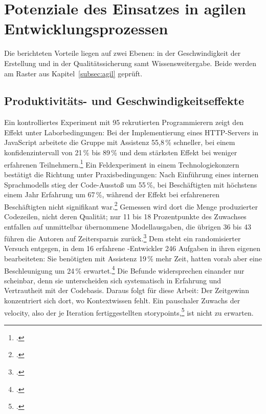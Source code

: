 \section{Potenziale des Einsatzes in agilen Entwicklungsprozessen}\label{sec:potenziale}
Die berichteten Vorteile liegen auf zwei Ebenen: in der Geschwindigkeit der Erstellung und in der Qualitätssicherung samt Wissensweitergabe. Beide werden am Raster aus Kapitel~\ref{subsec:agil} geprüft.

\subsection{Produktivitäts- und Geschwindigkeitseffekte}\label{subsec:produktivitaet}
Ein kontrolliertes Experiment mit 95 rekrutierten Programmierern zeigt den Effekt unter Laborbedingungen: Bei der Implementierung eines \acs{HTTP}-Servers in JavaScript arbeitete die Gruppe mit Assistenz 55,8\,\% schneller, bei einem \gls{konfidenzintervall} von 21\,\% bis 89\,\% und dem stärksten Effekt bei weniger erfahrenen Teilnehmern.\footcite[\vglf][ f.]{Peng.2023} Ein Feldexperiment in einem Technologiekonzern bestätigt die Richtung unter Praxisbedingungen: Nach Einführung eines internen Sprachmodells stieg der Code-Ausstoß um 55\,\%, bei Beschäftigten mit höchstens einem Jahr Erfahrung um 67\,\%, während der Effekt bei erfahreneren Beschäftigten nicht signifikant war.\footcite[\vglf][]{Gambacorta.2024} Gemessen wird dort die Menge produzierter Codezeilen, nicht deren Qualität; nur 11 bis 18 Prozentpunkte des Zuwachses entfallen auf unmittelbar übernommene Modellausgaben, die übrigen 36 bis 43 führen die Autoren auf Zeitersparnis zurück.\footcite[\vglf][]{Gambacorta.2024} Dem steht ein randomisierter Versuch entgegen, in dem 16 erfahrene -Entwickler 246 Aufgaben in ihren eigenen  bearbeiteten: Sie benötigten mit Assistenz 19\,\% mehr Zeit, hatten vorab aber eine Beschleunigung um 24\,\% erwartet.\footcite[\vglf][]{Becker.2025} Die Befunde widersprechen einander nur scheinbar, denn sie unterscheiden sich systematisch in Erfahrung und Vertrautheit mit der Codebasis. Daraus folgt für diese Arbeit: Der Zeitgewinn konzentriert sich dort, wo Kontextwissen fehlt. Ein pauschaler Zuwachs der \gls{velocity}, also der je Iteration fertiggestellten \glspl{storypoint},\footcite[\vglf][]{Preussig.2020} ist nicht zu erwarten.

